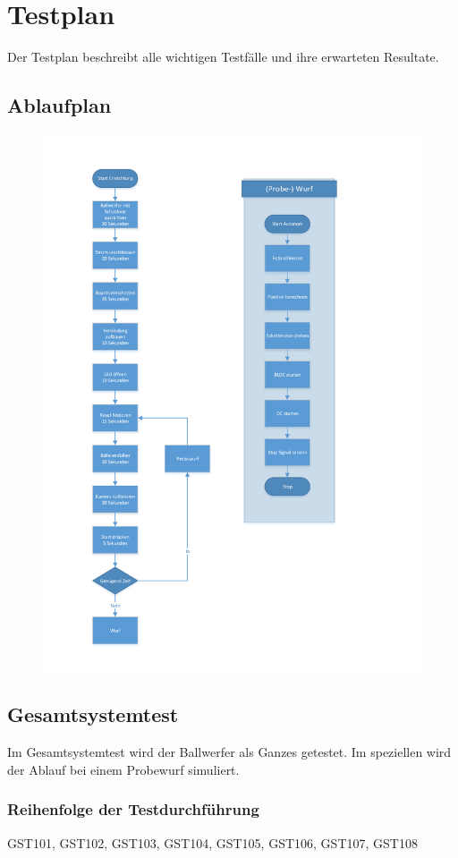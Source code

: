 \section{Testplan}

Der Testplan beschreibt alle wichtigen Testfälle und ihre erwarteten Resultate.

\subsection{Ablaufplan}
\begin{figure}[h!]
	\centering
	\includegraphics[width=0.7\linewidth]{../../fig/ablauf-ballwurf}
	\caption{}
	\label{fig:ablauf-ballwurf}
\end{figure}


\subsection{Gesamtsystemtest}

Im Gesamtsystemtest wird der Ballwerfer als Ganzes getestet. Im speziellen wird der Ablauf bei einem Probewurf simuliert.

\subsubsection{Reihenfolge der Testdurchführung}
GST101, GST102, GST103, GST104, GST105, GST106, GST107, GST108

